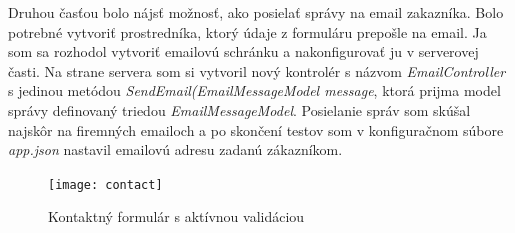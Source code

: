 \documentclass[11pt, oneside]{report}
\begin{document}
 Druhou časťou bolo nájsť možnosť, ako posielať správy na email zakazníka. Bolo potrebné vytvoriť prostredníka, ktorý údaje z formuláru prepošle na email.  Ja som sa rozhodol vytvoriť emailovú schránku a nakonfigurovať ju v serverovej časti. Na strane servera som si vytvoril nový kontrolér s názvom  \textit{EmailController} s jedinou metódou \textit{SendEmail(EmailMessageModel message}, ktorá prijma model správy definovaný  triedou \textit{EmailMessageModel}. Posielanie správ som skúšal najskôr na firemných emailoch a po  skončení testov som v konfiguračnom súbore \textit{app.json} nastavil emailovú adresu zadanú zákazníkom.
\begin{figure}[H]
    \centering
    \texttt{[image: contact]}
    \caption{Kontaktný formulár s aktívnou validáciou }
    \label{fig:contactform}
\end{figure}
\end{document}
